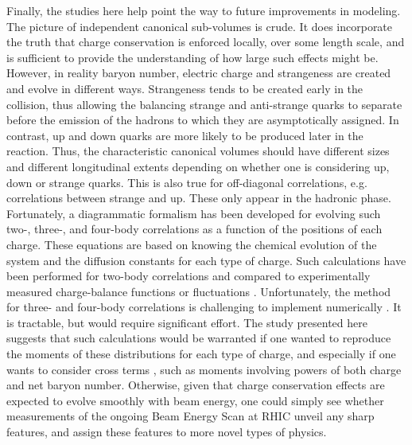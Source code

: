 Finally, the studies here help point the way to future improvements in modeling. The picture of independent canonical sub-volumes is crude. It does incorporate the truth that charge conservation is enforced locally, over some length scale, and is sufficient to provide the understanding of how large such effects might be. However, in reality baryon number, electric charge and strangeness are created and evolve in different ways. Strangeness tends to be created early in the collision, thus allowing the balancing strange and anti-strange quarks to separate before the emission of the hadrons to which they are asymptotically assigned. In contrast, up and down quarks are more likely to be produced later in the reaction. Thus, the characteristic canonical volumes should have different sizes and different longitudinal extents depending on whether one is considering up, down or strange quarks. This is also true for off-diagonal correlations, e.g. correlations between strange and up. These only appear in the hadronic phase. Fortunately, a diagrammatic formalism has been developed for evolving such two-, three-, and four-body correlations as a function of the positions of each charge. These equations are based on knowing the chemical evolution of the system and the diffusion constants for each type of charge. Such calculations have been performed for two-body correlations and compared to experimentally measured charge-balance functions \cite{Pratt:2018ebf,Pratt:2019pnd} or fluctuations \cite{Aziz:2004qu}. Unfortunately, the method for three- and four-body correlations  is challenging to implement numerically \cite{Pratt:2019fbj}. It is tractable, but would require significant effort. The study presented here suggests that such calculations would be warranted if one wanted to reproduce the moments of these distributions for each type of charge, and especially if one wants to consider cross terms \cite{Abdelwahab:2014yha}, such as moments involving powers of both charge and net baryon number. Otherwise, given that charge conservation effects are expected to evolve smoothly with beam energy, one could simply see whether measurements of the ongoing Beam Energy Scan at RHIC unveil any sharp features, and assign these features to more novel types of physics. 